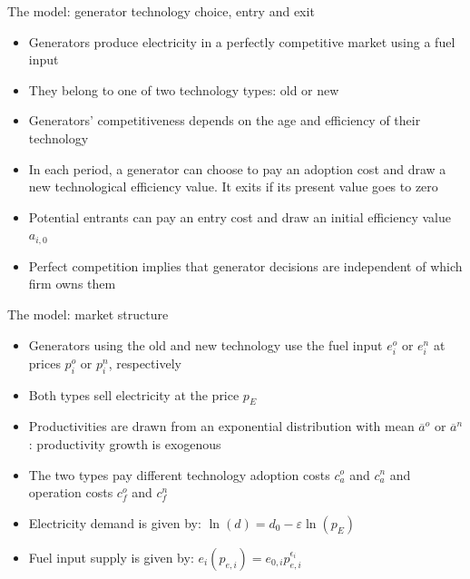 \documentclass{beamer}
\begin{document}
\begin{frame}{The model: generator technology choice, entry and exit}

\begin{itemize}
 \item Generators produce electricity in a perfectly competitive market using a fuel input
 \item They belong to one of two technology types: old or new
 \item Generators' competitiveness depends on the age and efficiency of their technology
 \item In each period, a generator can choose to pay an adoption cost and draw a new technological efficiency value. It exits if its present value goes to zero
 \item Potential entrants can pay an entry cost and draw an initial efficiency value $a_{i,0}$
 \item Perfect competition implies that generator decisions are independent of which firm owns them
\end{itemize}
    
\end{frame}
\begin{frame}{The model: market structure}
\begin{itemize}
 \item Generators using the old and new technology use the fuel input $e_i^o$ or $e_i^n$ at prices $p_i^o$ or $p_i^n$, respectively
  \item Both types sell electricity at the price $p_E$
 \item Productivities are drawn from an exponential distribution with mean $\overline{a}^o$ or $\overline{a}^n$: productivity growth is exogenous
 \item The two types pay different technology adoption costs $c_a^o$ and $c_a^n$ and operation costs $c_f^o$ and $c_f^n$
 \item Electricity demand is given by: $\ln(d) = d_0-\varepsilon\ln(p_E)$
 \item Fuel input supply is given by:  $e_i(p_{e,i}) = e_{0,i}p_{e,i}^{\epsilon_{i}}$

\end{itemize}
    
\end{frame}
\end{document}
